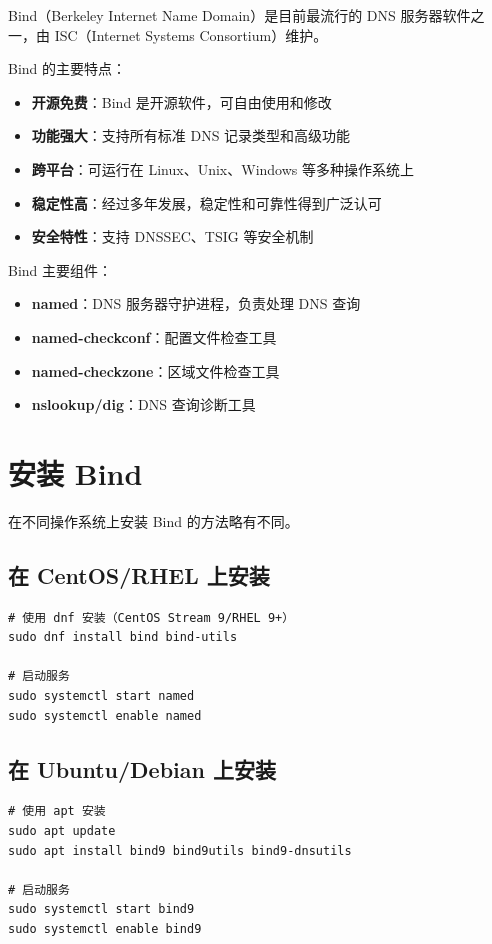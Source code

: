 \documentclass[12pt,UTF8]{ctexbook}
\begin{document}
Bind（Berkeley Internet Name Domain）是目前最流行的 DNS 服务器软件之一，由 ISC（Internet Systems Consortium）维护。

Bind 的主要特点：
\begin{itemize}
    \item \textbf{开源免费}：Bind 是开源软件，可自由使用和修改
    \item \textbf{功能强大}：支持所有标准 DNS 记录类型和高级功能
    \item \textbf{跨平台}：可运行在 Linux、Unix、Windows 等多种操作系统上
    \item \textbf{稳定性高}：经过多年发展，稳定性和可靠性得到广泛认可
    \item \textbf{安全特性}：支持 DNSSEC、TSIG 等安全机制
\end{itemize}

Bind 主要组件：
\begin{itemize}
    \item \textbf{named}：DNS 服务器守护进程，负责处理 DNS 查询
    \item \textbf{named-checkconf}：配置文件检查工具
    \item \textbf{named-checkzone}：区域文件检查工具
    \item \textbf{nslookup/dig}：DNS 查询诊断工具
\end{itemize}

\section{安装 Bind}
\label{sec:install_bind}

在不同操作系统上安装 Bind 的方法略有不同。

\subsection{在 CentOS/RHEL 上安装}

\begin{verbatim}
# 使用 dnf 安装（CentOS Stream 9/RHEL 9+）
sudo dnf install bind bind-utils

# 启动服务
sudo systemctl start named
sudo systemctl enable named
\end{verbatim}

\subsection{在 Ubuntu/Debian 上安装}

\begin{verbatim}
# 使用 apt 安装
sudo apt update
sudo apt install bind9 bind9utils bind9-dnsutils

# 启动服务
sudo systemctl start bind9
sudo systemctl enable bind9
\end{verbatim}
\end{document}
